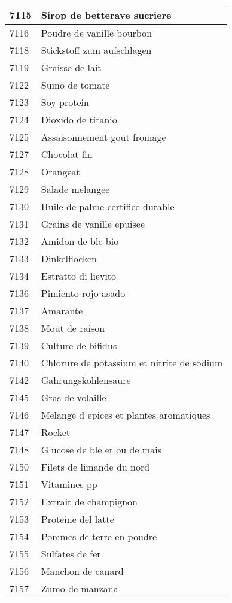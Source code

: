 \begin{longtable}{|l|l|}
7115 & Sirop de betterave sucriere \\ \hline 
7116 & Poudre de vanille bourbon \\ \hline 
7118 & Stickstoff zum aufschlagen \\ \hline 
7119 & Graisse de lait \\ \hline 
7122 & Sumo de tomate \\ \hline 
7123 & Soy protein \\ \hline 
7124 & Dioxido de titanio \\ \hline 
7125 & Assaisonnement gout fromage \\ \hline 
7127 & Chocolat fin \\ \hline 
7128 & Orangeat \\ \hline 
7129 & Salade melangee \\ \hline 
7130 & Huile de palme certifiee durable \\ \hline 
7131 & Grains de vanille epuisee \\ \hline 
7132 & Amidon de ble bio \\ \hline 
7133 & Dinkelflocken \\ \hline 
7134 & Estratto di lievito \\ \hline 
7136 & Pimiento rojo asado \\ \hline 
7137 & Amarante \\ \hline 
7138 & Mout de raison \\ \hline 
7139 & Culture de bifidus \\ \hline 
7140 & Chlorure de potassium et nitrite de sodium \\ \hline 
7142 & Gahrungskohlensaure \\ \hline 
7145 & Gras de volaille \\ \hline 
7146 & Melange d epices et plantes aromatiques \\ \hline 
7147 & Rocket \\ \hline 
7148 & Glucose de ble et ou de mais \\ \hline 
7150 & Filets de limande du nord \\ \hline 
7151 & Vitamines pp \\ \hline 
7152 & Extrait de champignon \\ \hline 
7153 & Proteine del latte \\ \hline 
7154 & Pommes de terre en poudre \\ \hline 
7155 & Sulfates de fer \\ \hline 
7156 & Manchon de canard \\ \hline 
7157 & Zumo de manzana \\ \hline 

\end{longtable}
